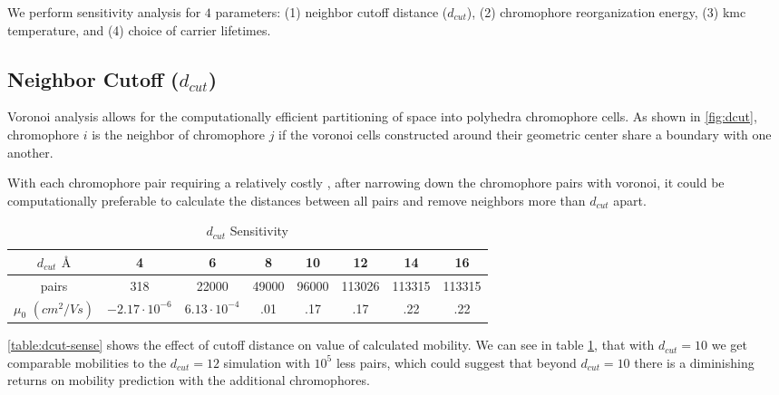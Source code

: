 We perform sensitivity analysis for $4$ parameters: (1) neighbor cutoff
distance ($d_{cut}$), (2) chromophore reorganization energy, (3) \gls{kmc}
temperature, and (4) choice of carrier lifetimes. 

\subsection{Neighbor Cutoff ($d_{cut}$)}
\label{dcutresults}
Voronoi analysis allows for the computationally efficient partitioning of space into
polyhedra chromophore cells. As shown in \ref{fig:dcut}, chromophore $i$ is the neighbor of chromophore $j$
if the voronoi cells constructed around their geometric center
share a boundary with one another. 

With each chromophore pair requiring a relatively costly , after narrowing down the chromophore pairs with voronoi, it
could be
computationally preferable to calculate the distances between all pairs and remove neighbors more than $d_{cut}$
apart.

\begin{table}
\caption{$d_{cut}$ Sensitivity}
\centering %
\begin{tabular}{c c c c c c c c} %
\hline\hline %
    $d_{cut}$ $\text{\AA}$ & 4 & 6 & 8 & 10 & 12 & 14 & 16 \\ [0.5ex] %
\hline  %
pairs & 318 & 22000 & 49000 & 96000 & 113026 & 113315 & 113315 \\ [1ex]%
$\mu_{0}$ $(cm^{2}/Vs)$ & $-2.17 \cdot 10^{-6}$ & $6.13 \cdot 10^{-4}$ & .01 & .17 & .17 & .22 & .22 \\ [1ex] %
\hline %
\end{tabular}
\label{table:dcut-sense} %
\end{table}

\autoref{table:dcut-sense} shows the effect of cutoff distance on value of
calculated mobility.  
 We can see in table \ref{table:dcut-sense}, that with $d_{cut}=10$ we get comparable mobilities to the
$d_{cut}=12$ simulation with $10^5$ less
pairs, which could suggest that beyond $d_{cut}=10$ there is a diminishing returns on mobility prediction with the additional chromophores. 

